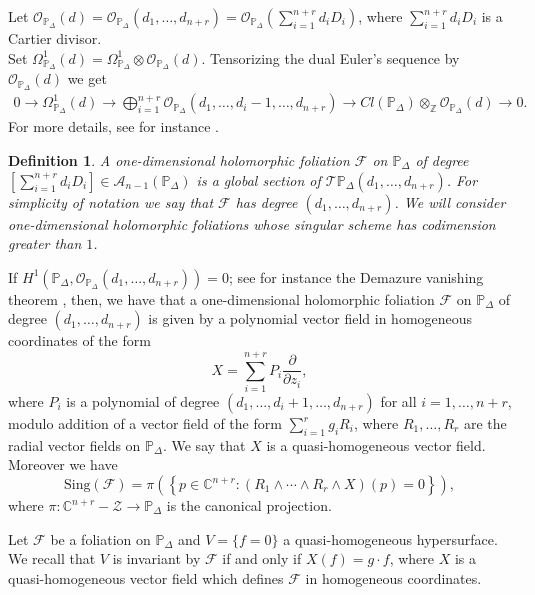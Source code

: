 \documentclass[11pt]{amsart}
\theoremstyle{plain}
\newtheorem{defi}{Definition}[section]
\theoremstyle{definition}
\begin{document}
Let $\mathcal{O}_{\mathbb{P}_{\Delta}}(d)=\mathcal{O}_{\mathbb{P}_{\Delta}}(d_1,\ldots,d_{n+r})
=\mathcal{O}_{\mathbb{P}_{\Delta}}(\sum_{i=1}^{n+r}d_{i}D_{i})$, 
where $\sum_{i=1}^{n+r}d_{i}D_{i}$ is a Cartier divisor. \\ %
Set
$\Omega^1_{\mathbb{P}_{\Delta}}(d)=\Omega^1_{\mathbb{P}_{\Delta}}\otimes \mathcal{O}_{\mathbb{P}_{\Delta}}(d)$.
Tensorizing the dual Euler's sequence by $\mathcal{O}_{\mathbb{P}_{\Delta}}(d)$ we get
\begin{eqnarray*}
0 \rightarrow \Omega^1_{\mathbb{P}_{\Delta}}(d)
\rightarrow \bigoplus_{i=1}^{n+r}\mathcal{O}_{\mathbb{P}_{\Delta}}(d_1,\dots,d_i-1,\dots,d_{n+r})
\rightarrow Cl(\mathbb{P}_{\Delta})\otimes_{\mathbb{Z}}\mathcal{O}_{\mathbb{P}_{\Delta}}(d) \rightarrow 0.
\end{eqnarray*}
For more details, see for instance \cite{Cox1, Cox2}.

\begin{defi} 
A one-dimensional holomorphic foliation $\mathcal{F}$ on $\mathbb{P}_{\Delta}$ of degree 
$\left[\sum_{i=1}^{n+r}d_{i}D_{i}\right]\in\mathcal{A}_{n-1}(\mathbb{P}_{\Delta})$
is a global section of $\mathcal{T}\mathbb{P}_{\Delta}(d_1,\dots,d_{n+r})$.
For simplicity of notation we say that $\mathcal{F}$ has degree $(d_1,\dots,d_{n+r})$.
We will consider one-dimensional holomorphic foliations whose singular scheme has codimension greater than $1$.
\end{defi}

If $H^1\left(\mathbb{P}_{\Delta}, \mathcal{O}_{\mathbb{P}_{\Delta}}
(d_1,\dots,d_{n+r})\right)=0$; see for instance the Demazure vanishing theorem \cite[Theorem $9.2.3$]{Cox2},
then, we have that a one-dimensional holomorphic foliation $\mathcal{F}$ on
$\mathbb{P}_{\Delta}$ of degree $(d_1,\dots,d_{n+r})$ is given by a
polynomial vector field in homogeneous coordinates of the form
$$
X=\sum_{i=1}^{n+r}P_i\frac{\partial}{\partial z_i},
$$
where $P_i$ is a polynomial of degree $(d_1,\dots,d_i+1,\dots,d_{n+r})$
for all $i=1,\dots,n+r$, modulo addition of a vector field of the form
$\sum_{i=1}^{r}g_iR_i$, where $R_1,\dots,R_r$ are the radial vector fields on $\mathbb{P}_{\Delta}$.
We say that $X$ is a quasi-homogeneous vector field. Moreover we have  
$$\mathrm{Sing}(\mathcal{F})=\pi\left(\left\{p\in\mathbb{C}^{n+r} : (R_1\wedge\cdots\wedge R_r\wedge X)(p)=0\right\}\right),$$
where $\pi:\mathbb{C}^{n+r}-{\mathcal{Z}} \rightarrow \mathbb{P}_{\Delta}$ is the canonical projection. 

Let $\mathcal{F}$ be a foliation on $\mathbb{P}_{\Delta}$ and $V = \{f = 0\}$ a quasi-homogeneous
hypersurface. We recall that $V$ is invariant by $\mathcal{F}$ if and only if 
$X(f) = g\cdot f$, where $X$ is a quasi-homogeneous vector field which defines $\mathcal{F}$ in homogeneous coordinates.
\end{document}
